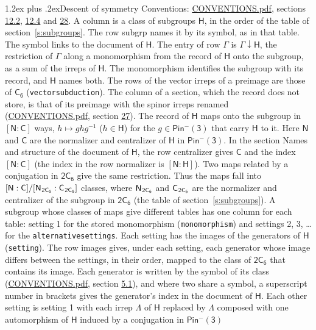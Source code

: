 \documentclass[10pt,a4paper]{article}
\makeatletter
\renewcommand\section{\@startsection{section}{1}{\z@}{-3ex plus -1ex minus -.2ex}%
  {1.2ex plus .2ex}{\normalfont\large\sffamily\bfseries\color{parttitle}}}
\numberwithin{equation}{section}
\newcommand{\grp}[1]{\mathsf{#1}}
\newcommand{\grpindex}[2]{[#1 : #2]}
\newcommand{\restr}[2]{#1\!\downarrow#2}
\newcommand{\hairsp}{\mkern1mu}
\makeatother
\begin{document}
\section{Descent of symmetry}\label{s:subduction}
Conventions: \href{../../CONVENTIONS.pdf}{CONVENTIONS.pdf}, sections \href{../../../rotation/CONVENTIONS.pdf\#conv.12.2}{12.2}, \href{../../../rotation/CONVENTIONS.pdf\#conv.12.4}{12.4} and \href{../../CONVENTIONS.pdf\#conv.28}{28}.
A column is a class of subgroups $\grp{H}$, in the order of the table of section~\ref{s:subgroups}. The row subgrp names it by its symbol, as in that table. The symbol links to the document of $\grp{H}$. The entry of row $\Gamma$ is $\restr{\Gamma}{\grp{H}}$, the restriction of $\Gamma$ along a monomorphism from the record of $\grp{H}$ onto the subgroup, as a sum of the irreps of $\grp{H}$. The monomorphism identifies the subgroup with its record, and $\grp{H}$ names both. The rows of the vector irreps of a preimage are those of \href{../../../rotation/data/pdf/C6.pdf}{$\grp{C_{6}}$} (\texttt{vectorsubduction}). The column of a section, which the record does not store, is that of its preimage with the spinor irreps renamed (\href{../../CONVENTIONS.pdf}{CONVENTIONS.pdf}, section \href{../../CONVENTIONS.pdf\#conv.27}{27}). \label{n:group.normalizer.o3}\label{n:group.centralizer.o3}\label{n:element.h}The record of $\grp{H}$ maps onto the subgroup in $\grpindex{\grp{N}}{\grp{C}}$ ways, $h \mapsto g h g^{-1}$ ($h \in \grp{H}$) for the $g \in \grp{Pin^{-}(3)}$ that carry $\grp{H}$ to it. Here $\grp{N}$ and $\grp{C}$ are the normalizer and centralizer of $\grp{H}$ in \href{Pinminus3.pdf}{$\grp{Pin^{-}(3)}$}. In the section Names and structure of the document of $\grp{H}$, the row centralizer gives $\grp{C}$ and the index $\grpindex{\grp{N}}{\grp{C}}$ (the index in the row normalizer is $\grpindex{\grp{N}}{\grp{H}}$). Two maps related by a conjugation in $\grp{2C_{6}}$ give the same restriction. Thus the maps fall into $\grpindex{\grp{N}}{\grp{C}}/\grpindex{\grp{N}_{\hairsp \grp{2C_{6}}}}{\grp{C}_{\hairsp \grp{2C_{6}}}}$ classes, where $\grp{N}_{\hairsp \grp{2C_{6}}}$ and $\grp{C}_{\hairsp \grp{2C_{6}}}$ are the normalizer and centralizer of the subgroup in $\grp{2C_{6}}$ (the table of section~\ref{s:subgroups}). \label{n:head.setting}A subgroup whose classes of maps give different tables has one column for each table: setting 1 for the stored monomorphism (\texttt{monomorphism}) and settings 2, 3, \dots{} for the \texttt{alternativesettings}. Each setting has the images of the generators of $\grp{H}$ (\texttt{setting}). \label{n:head.images}The row images gives, under each setting, each generator whose image differs between the settings, in their order, mapped to the class of $\grp{2C_{6}}$ that contains its image. Each generator is written by the symbol of its class (\href{../../CONVENTIONS.pdf}{CONVENTIONS.pdf}, section \href{../../../rotation/CONVENTIONS.pdf\#conv.5.1}{5.1}), and where two share a symbol, a superscript number in brackets gives the generator's index in the document of $\grp{H}$. \label{n:irrep.Delta}Each other setting is setting 1 with each irrep $\Lambda$ of $\grp{H}$ replaced by $\Lambda$ composed with one automorphism of $\grp{H}$ induced by a conjugation in \href{Pinminus3.pdf}{$\grp{Pin^{-}(3)}$} 
\end{document}
